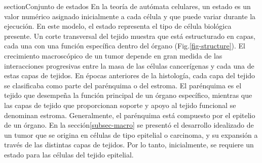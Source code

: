 section{Conjunto de estados}
\label{subsec-states}
En la teoría de autómata celulares, un estado es un valor numérico asignado inicialmente a cada célula y que puede variar durante la ejecución. En este modelo, el estado representa el tipo de célula biológica presente. Un corte transversal del tejido muestra que está estructurado en capas, cada una con una función específica dentro del órgano (Fig.\ref{fig-structure}). El crecimiento macroscópico de un tumor depende en gran medida de las interacciones progresivas entre la masa de las células cancerígenas y cada una de estas capas de tejidos. En épocas anteriores de la histología, cada capa del tejido se clasificaba como parte del parénquima o del estroma. El parénquima es el tejido que desempeña la función principal de un órgano específico, mientras que las capas de tejido que proporcionan soporte y apoyo al tejido funcional se denominan estroma. Generalmente, el parénquima está compuesto por el epitelio de un órgano. En la sección\ref{subsec-macro} se presentó el desarrollo idealizado de un tumor que se origina en células de tipo epitelial o carcinoma, y su expansión a través de las distintas capas de tejidos. Por lo tanto, inicialmente, se requiere un estado para las células del tejido epitelial.

